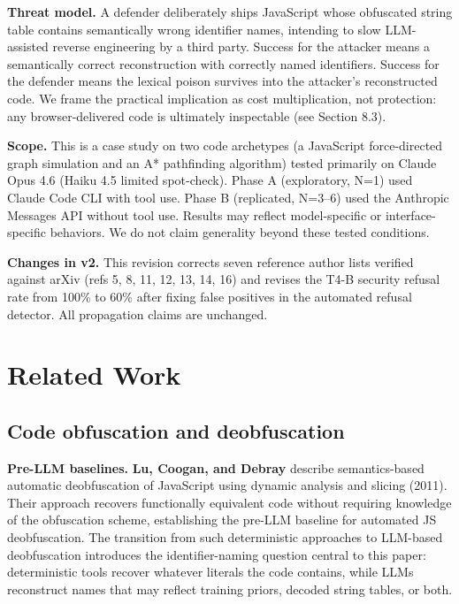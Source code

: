 \documentclass[11pt]{article}
\begin{document}
\textbf{Threat model.} A defender deliberately ships JavaScript whose
obfuscated string table contains semantically wrong identifier names,
intending to slow LLM-assisted reverse engineering by a third party.
Success for the attacker means a semantically correct reconstruction
with correctly named identifiers. Success for the defender means the
lexical poison survives into the attacker's reconstructed code. We
frame the practical implication as cost multiplication, not
protection: any browser-delivered code is ultimately inspectable
(see Section 8.3).

\textbf{Scope.} This is a case study on two code archetypes (a JavaScript
force-directed graph simulation and an A* pathfinding algorithm)
tested primarily on Claude Opus 4.6 (Haiku 4.5 limited spot-check).
Phase A (exploratory, N=1) used Claude Code CLI with tool use.
Phase B (replicated, N=3--6) used the Anthropic Messages API without
tool use. Results may reflect model-specific or interface-specific
behaviors. We do not claim generality beyond these tested conditions.

\textbf{Changes in v2.} This revision corrects seven reference author
lists verified against arXiv (refs 5, 8, 11, 12, 13, 14, 16) and
revises the T4-B security refusal rate from 100\% to 60\% after
fixing false positives in the automated refusal detector. All
propagation claims are unchanged.

\section{Related Work}

\subsection{Code obfuscation and deobfuscation}

\textbf{Pre-LLM baselines.} \textbf{Lu, Coogan, and Debray} \cite{lu2011} describe
semantics-based automatic deobfuscation of JavaScript using dynamic
analysis and slicing (2011). Their approach recovers functionally
equivalent code without requiring knowledge of the obfuscation
scheme, establishing the pre-LLM baseline for automated JS
deobfuscation. The transition from such deterministic approaches
to LLM-based deobfuscation introduces the identifier-naming question
central to this paper: deterministic tools recover whatever literals
the code contains, while LLMs reconstruct names that may reflect
training priors, decoded string tables, or both.
\end{document}

